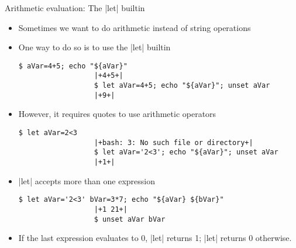 \begin{frame}[fragile]{Arithmetic evaluation: The \bash|let| builtin}
    \vspace{-4mm}
    \begin{itemize}
        \item Sometimes we want to do arithmetic instead of string operations
        \item One way to do so is to use the \bash|let| builtin
              \begin{lstlisting}[style=MyBash, style=oddnumbers, aboveskip=2mm, belowskip=-6mm]
                  $ aVar=4+5; echo "${aVar}"
                  |+4+5+|
                  $ let aVar=4+5; echo "${aVar}"; unset aVar
                  |+9+|
              \end{lstlisting}
        \item However, it requires quotes to use arithmetic operators 
              \begin{lstlisting}[style=MyBash, style=oddnumbers, aboveskip=2mm, belowskip=-6mm, firstnumber=4]
                  $ let aVar=2<3
                  |+bash: 3: No such file or directory+|
                  $ let aVar='2<3'; echo "${aVar}"; unset aVar
                  |+1+|
              \end{lstlisting}
        \item \bash|let| accepts more than one expression
              \begin{lstlisting}[style=MyBash, style=oddnumbers, aboveskip=2mm, belowskip=-6mm, firstnumber=8]
                  $ let aVar='2<3' bVar=3*7; echo "${aVar} ${bVar}"
                  |+1 21+|
                  $ unset aVar bVar
              \end{lstlisting}
        \item If the last expression evaluates to 0, \bash|let| returns 1; \bash|let| returns 0 otherwise.
    \end{itemize}
\end{frame}
